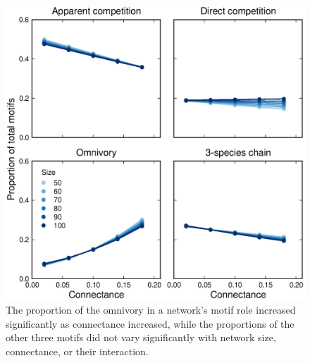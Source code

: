 \documentclass[12pt]{article}
\begin{document}
\begin{spacing}{2.0}
    \begin{figure}[hb!]
        \centering
        \includegraphics[width=\textwidth]{figures/motif_proportion_lms.eps}
        \caption{The proportion of the omnivory in a network's motif role increased significantly as connectance increased, while the proportions of the other three motifs did not vary significantly with network size, connectance, or their interaction.}
        \label{motif_proportion_lms}
    \end{figure}

\clearpage


\end{spacing}
\end{document}
